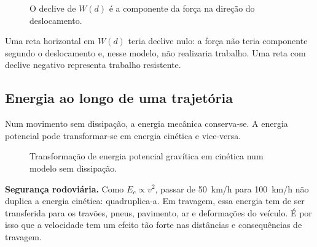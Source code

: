 \documentclass[11pt,a4paper,oneside]{book}
\begin{document}
\begin{figure}[H]
\centering
{}
\caption{O declive de $W(d)$ é a componente da força na direção do deslocamento.}
\end{figure}

\begin{leituragrafico}
Uma reta horizontal em $W(d)$ teria declive nulo: a força não teria componente segundo o deslocamento e, nesse modelo, não realizaria trabalho. Uma reta com declive negativo representa trabalho resistente.
\end{leituragrafico}

\subsection*{Energia ao longo de uma trajetória}
Num movimento sem dissipação, a energia mecânica conserva-se. A energia potencial pode transformar-se em energia cinética e vice-versa.

\begin{figure}[H]
\centering
{}
\caption{Transformação de energia potencial gravítica em cinética num modelo sem dissipação.}
\end{figure}

\begin{mundo}
\textbf{Segurança rodoviária.} Como $E_c\propto v^2$, passar de \SI{50}{km/h} para \SI{100}{km/h} não duplica a energia cinética: quadruplica-a. Em travagem, essa energia tem de ser transferida para os travões, pneus, pavimento, ar e deformações do veículo. É por isso que a velocidade tem um efeito tão forte nas distâncias e consequências de travagem.
\end{mundo}
\end{document}
